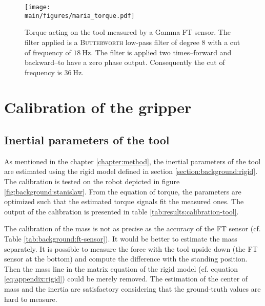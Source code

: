 \documentclass[/home/francois/latex/report/main.tex]{subfiles}
\begin{document}
\begin{figure}[ht!]
  \centering
  \texttt{[image: \\main/figures/maria\_torque.pdf]}
  \caption{Torque acting on the tool measured by a Gamma \ac{FT} sensor. The  filter applied is a \textsc{Butterworth} low-pass filter of degree 8 with a cut of frequency of $18 \ \si{\hertz}$. The filter is applied two times–forward and backward–to have a zero phase output. Consequently the cut of frequency is $36 \ \si{\hertz}$. \label{fig:results:force-torque}}
  \label{fig:results:torque}
\end{figure}

\clearpage

\section{Calibration of the gripper}
\label{section:results:calibration}

\subsection{Inertial parameters of the tool}

As mentioned in the chapter \ref{chapter:method}, the inertial parameters of the tool are estimated using the rigid model defined in section \ref{section:background:rigid}. The calibration is tested on the robot depicted in figure \ref{fig:background:stanislaw}. From the equation of torque, the parameters are optimized such that the estimated torque signals fit the measured ones. The output of the calibration is presented in table \ref{tab:results:calibration-tool}.

The calibration of the mass is not as precise as the accuracy of the \ac{FT} sensor (cf. Table \ref{tab:background:ft-sensor}). It would be better to estimate the mass separately. It is possible to measure the force with the tool upside down (the \ac{FT} sensor at the bottom) and compute the difference with the standing position. Then the mass line in the matrix equation of the rigid model (cf. equation \ref{eq:appendix:rigid}) could be merely removed. The estimation of the center of mass and the inertia are satisfactory considering that the ground-truth values are hard to measure.
\end{document}
